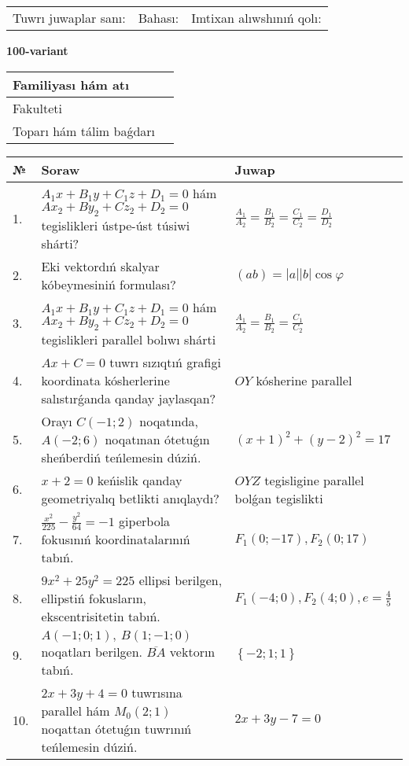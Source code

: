 \documentclass{article}
\begin{document}
\vspace{1cm}

\begin{tabular}{lll}
Tuwrı juwaplar sanı: \underline{\hspace{1.5cm}} & 
Bahası: \underline{\hspace{1.5cm}} & 
Imtixan alıwshınıń qolı: \underline{\hspace{2cm}} \\
\end{tabular}

\egroup

\newpage


\textbf{100-variant}\\

\bgroup
\def\arraystretch{1.6} %

\begin{tabular}{|m{5.7cm}|m{9.5cm}|}
\hline
Familiyası hám atı & \\
\hline
Fakulteti  & \\
\hline
Toparı hám tálim baǵdarı  & \\
\hline
\end{tabular}

\vspace{1cm}

\begin{tabular}{|m{0.7cm}|m{10cm}|m{4cm}|}
\hline
№ & Soraw & Juwap \\
\hline
1. & $A_1x+B_1y+C_1z+D_1=0$ hám $Ax_2+By_2+Cz_2+D_2=0$ tegislikleri ústpe-úst túsiwi shárti? & $\frac{A_1}{A_2}=\frac{B_1}{B_2}=\frac{C_1}{C_2}=\frac{D_1}{D_2}$ \\
\hline
2. & Eki vektordıń skalyar kóbeymesiniń formulası? & $(ab)=|a||b|\cos\varphi$ \\
\hline
3. & $A_1x+B_1y+C_1z+D_1=0$ hám $Ax_2+By_2+Cz_2+D_2=0$ tegislikleri parallel bolıwı shárti & $\frac{A_1}{A_2}=\frac{B_1}{B_2}=\frac{C_1}{C_2}$ \\
\hline
4. & $Ax+C=0$ tuwrı sızıqtıń grafigi koordinata kósherlerine salıstırǵanda qanday jaylasqan? & $OY$ kósherine parallel \\
\hline
5. & Orayı $C (-1;2)$ noqatında, $A (-2;6 )$ noqatınan ótetuǵın sheńberdiń teńlemesin dúziń. & $(x+1)^{2}+(y-2)^{2}=17$ \\
\hline
6. & $x+2=0$ keńislik qanday geometriyalıq betlikti anıqlaydı? &  $OYZ$ tegisligine parallel bolǵan tegislikti \\
\hline
7. & $\frac{x^{2}}{225}-\frac{y^{2}}{64}=-1$ giperbola fokusınıń koordinatalarınıń tabıń. & $F_{1}(0;-17), F_{2}(0;17)$ \\
\hline
8. & $9x^{2}+25y^{2}=225$ ellipsi berilgen, ellipstiń fokusların, ekscentrisitetin tabıń. & $F_1\left(-4;0 \right) , F_2\left( 4;0 \right) , e = \frac{4}{5}$ \\
\hline
9. & $A (-1;0;1),\ B (1;-1;0)$ noqatları berilgen. $\overline{BA}$ vektorın tabıń. & $\left\{ - 2;1;1 \right\}$ \\
\hline
10. & $2x+3y+4=0$ tuwrısına parallel hám $M_{0} (2;1)$ noqattan ótetuǵın tuwrınıń teńlemesin dúziń. & $2x+3y-7=0$ \\
\hline
\end{tabular}
\end{document}
